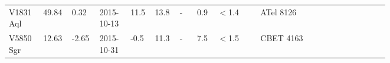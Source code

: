 \begin{landscape}
\begin{tiny}
\begin{table*}[!t]
\begin{tabular}{ L{0.07\linewidth} p{0.03\linewidth}  p{0.04\linewidth} p{0.07\linewidth} p{0.03\linewidth} p{0.04\linewidth} p{0.04\linewidth} p{0.03\linewidth} p{0.1\linewidth}  L{0.3\linewidth} }
V1831 Aql & 49.84 & 0.32 & 2015-10-13 & 11.5 & 13.8 & - & 0.9 & $<$1.4 & ATel 8126 \citep{ATel8126}\\
V5850 Sgr & 12.63 & -2.65 & 2015-10-31 & -0.5 & 11.3 & - & 7.5 & $<$1.5 & CBET 4163 \citep{CBET4163}\\
\hline
\hline
\end{tabular}
\end{table*}

\end{tiny}
\end{landscape}

